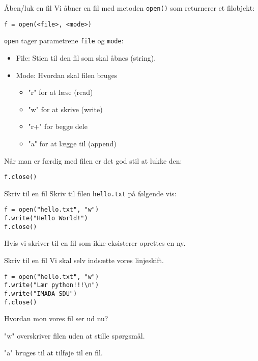 \begin{frame}[fragile]{Åben/luk en fil}
	Vi åbner en fil med metoden \texttt{open()} som returnerer et filobjekt:
	\begin{lstlisting}[style=python]
f = open(<file>, <mode>)
	\end{lstlisting}
	
	\pause
	\texttt{open} tager parametrene \texttt{file} og \texttt{mode}:
	\begin{itemize}
		\item File: Stien til den fil som skal åbnes (string).
		\item Mode: Hvordan skal filen bruges 
		\begin{itemize}
			\item "r" for at læse (read)
			\item "w" for at skrive (write)
			\item "r+" for begge dele
			\item "a" for at lægge til (append)
		\end{itemize}
	\end{itemize}

\pause
	Når man er færdig med filen er det god stil at lukke den:
	\begin{lstlisting}[style=python]
f.close()
	\end{lstlisting}
\end{frame}


\begin{frame}[fragile]{Skriv til en fil}
Skriv til filen \texttt{hello.txt} på følgende vis:

\begin{lstlisting}[style=python]
f = open("hello.txt", "w")
f.write("Hello World!")
f.close()
\end{lstlisting}

Hvis vi skriver til en fil som ikke eksisterer oprettes en ny.

\end{frame}

\begin{frame}[fragile]{Skriv til en fil}
Vi skal selv indsætte vores linjeskift.

\begin{lstlisting}[style=python]
f = open("hello.txt", "w")
f.write("Lær python!!!\n")
f.write("IMADA SDU")
f.close()
\end{lstlisting}

Hvordan mon vores fil ser ud nu?

\pause

"w" overskriver filen uden at stille spørgsmål.

"a" bruges til at tilføje til en fil.

\end{frame}


